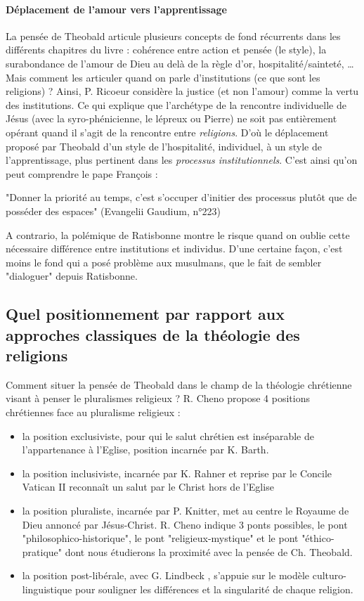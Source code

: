 \paragraph{Déplacement de l'amour vers l'apprentissage} La pensée de Theobald articule plusieurs concepts de fond récurrents dans les différents chapitres du livre : cohérence entre action et pensée (le style), la surabondance de l'amour de Dieu au delà de la règle d'or, hospitalité/sainteté, \ldots Mais comment les articuler quand on parle d'institutions (ce que sont les religions) ? Ainsi, P. Ricoeur \cite{ricoeur_soi-meme_1990} considère la justice (et non l'amour) comme la vertu des institutions. Ce qui explique que l'archétype de la rencontre individuelle de Jésus (avec la syro-phénicienne, le lépreux  ou Pierre) ne soit pas entièrement opérant quand il s'agit de la rencontre entre \textit{religions}. D'où le déplacement proposé par Theobald d'un style de l'hospitalité, individuel, à un style de l'apprentissage, plus pertinent dans les \textit{processus institutionnels}. C'est ainsi qu'on peut comprendre le pape François :
\begin{singlequote}
     "Donner la priorité au temps, c'est s'occuper d'initier des processus plutôt que de posséder des espaces" (Evangelii Gaudium, n°223)
\end{singlequote}
A contrario, la polémique de Ratisbonne montre le risque quand on oublie cette nécessaire différence entre institutions et individus. D'une certaine façon, c'est moins le fond qui a posé problème aux musulmans, que le fait de sembler "dialoguer" depuis Ratisbonne.


\subsection{Quel positionnement par rapport aux approches classiques de la théologie des religions}
Comment situer la pensée de Theobald dans le champ de la théologie chrétienne visant à penser le pluralismes religieux ? 
R. Cheno \cite{cheno_dieu_2017} propose 4 positions chrétiennes face au pluralisme religieux :
\begin{itemize}
    \item la position exclusiviste, pour qui le salut chrétien est inséparable de l'appartenance à l'Eglise, position incarnée par K. Barth.
    \item la position inclusiviste, incarnée par K. Rahner et reprise par le Concile Vatican II  reconnaît un salut par le Christ hors de l'Eglise
    \item la position pluraliste, incarnée par P. Knitter, met au centre le Royaume de Dieu annoncé par Jésus-Christ. R. Cheno indique 3 ponts possibles, le pont "philosophico-historique", le pont "religieux-mystique" et le pont "éthico-pratique" dont nous étudierons la proximité avec la pensée de Ch. Theobald.
    \item la position post-libérale, avec G. Lindbeck \cite{lindbeck_nature_2002}, s'appuie sur le modèle culturo-linguistique pour souligner les différences et la singularité de chaque religion.
\end{itemize}


